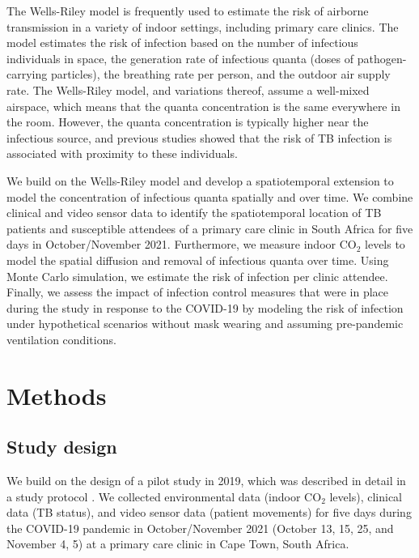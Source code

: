 \documentclass[fleqn,11pt]{wlscirep}
\begin{document}
The Wells-Riley model\cite{Riley1978AJE} is frequently used to estimate the risk of airborne transmission in a variety of indoor settings\cite{Andrews2014JID,Taylor2016IJTLD,Hella2017JInfect,Zemouri2020JDR}, including primary care clinics\cite{Zurcher2022JID,McCreesh2021BMJGlobalHealth}. The model estimates the risk of infection based on the number of infectious individuals in space, the generation rate of infectious quanta (doses of pathogen-carrying particles), the breathing rate per person, and the outdoor air supply rate. The Wells-Riley model, and variations thereof\cite{Rudnick2003IndoorAir}, assume a well-mixed airspace, which means that the quanta concentration is the same everywhere in the room. However, the quanta concentration is typically higher near the infectious source\cite{Wang2021Science,Vuorinen2020SafSci,Chen2020BuildEnv}, and previous studies showed that the risk of TB infection is associated with proximity to these individuals\cite{Ko2004RiskAnal,Kenyon1996NEJM}.

We build on the Wells-Riley model and develop a spatiotemporal extension to model the concentration of infectious quanta spatially and over time. We combine clinical and video sensor data to identify the spatiotemporal location of TB patients and susceptible attendees of a primary care clinic in South Africa for five days in October/November 2021. Furthermore, we measure indoor CO$_2$ levels to model the spatial diffusion and removal of infectious quanta over time. Using Monte Carlo simulation, we estimate the risk of infection per clinic attendee. Finally, we assess the impact of infection control measures that were in place during the study in response to the COVID-19 by modeling the risk of infection under hypothetical scenarios without mask wearing and assuming pre-pandemic ventilation conditions.

\newpage

\section{Methods}

\subsection{Study design}

We build on the design of a pilot study in 2019\cite{Zurcher2022JID}, which was described in detail in a study protocol \cite{Zurcher2020BMJ}. We collected environmental data (indoor CO$_2$ levels), clinical data (TB status), and video sensor data (patient movements) for five days during the COVID-19 pandemic in October/November 2021 (October 13, 15, 25, and November 4, 5) at a primary care clinic in Cape Town, South Africa. 
\end{document}
